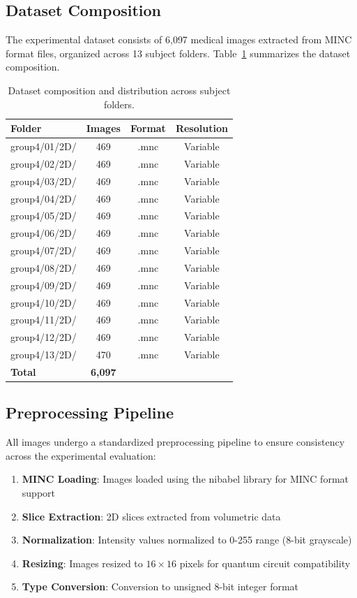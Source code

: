 \documentclass[pdflatex,sn-mathphys-num,Numbered]{sn-jnl}
\theoremstyle{thmstyleone}
\theoremstyle{thmstyletwo}
\theoremstyle{thmstylethree}
\begin{document}
\subsection{Dataset Composition}

The experimental dataset consists of 6,097 medical images extracted from MINC format files, organized across 13 subject folders. Table~\ref{tab:dataset} summarizes the dataset composition.

\begin{table}[!t]
\caption{Dataset composition and distribution across subject folders.}
\label{tab:dataset}
\centering
\begin{tabular}{@{}lccc@{}}
\toprule
Folder & Images & Format & Resolution \\
\midrule
group4/01/2D/ & 469 & .mnc & Variable \\
group4/02/2D/ & 469 & .mnc & Variable \\
group4/03/2D/ & 469 & .mnc & Variable \\
group4/04/2D/ & 469 & .mnc & Variable \\
group4/05/2D/ & 469 & .mnc & Variable \\
group4/06/2D/ & 469 & .mnc & Variable \\
group4/07/2D/ & 469 & .mnc & Variable \\
group4/08/2D/ & 469 & .mnc & Variable \\
group4/09/2D/ & 469 & .mnc & Variable \\
group4/10/2D/ & 469 & .mnc & Variable \\
group4/11/2D/ & 469 & .mnc & Variable \\
group4/12/2D/ & 469 & .mnc & Variable \\
group4/13/2D/ & 470 & .mnc & Variable \\
\midrule
\textbf{Total} & \textbf{6,097} & & \\
\bottomrule
\end{tabular}
\end{table}

\subsection{Preprocessing Pipeline}

All images undergo a standardized preprocessing pipeline to ensure consistency across the experimental evaluation:

\begin{enumerate}
\item \textbf{MINC Loading}: Images loaded using the nibabel library for MINC format support
\item \textbf{Slice Extraction}: 2D slices extracted from volumetric data
\item \textbf{Normalization}: Intensity values normalized to 0-255 range (8-bit grayscale)
\item \textbf{Resizing}: Images resized to $16 \times 16$ pixels for quantum circuit compatibility
\item \textbf{Type Conversion}: Conversion to unsigned 8-bit integer format
\end{enumerate}
\end{document}
